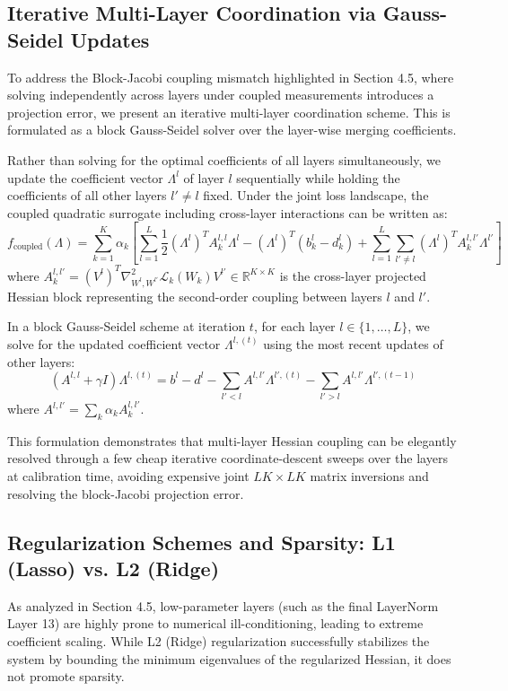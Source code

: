 \subsection{Iterative Multi-Layer Coordination via Gauss-Seidel Updates}
To address the Block-Jacobi coupling mismatch highlighted in Section 4.5, where solving independently across layers under coupled measurements introduces a projection error, we present an iterative multi-layer coordination scheme. This is formulated as a block Gauss-Seidel solver over the layer-wise merging coefficients.

Rather than solving for the optimal coefficients of all layers simultaneously, we update the coefficient vector $\Lambda^l$ of layer $l$ sequentially while holding the coefficients of all other layers $l' \neq l$ fixed. Under the joint loss landscape, the coupled quadratic surrogate including cross-layer interactions can be written as:
\begin{equation}
    f_{\text{coupled}}(\Lambda) = \sum_{k=1}^K \alpha_k \left[ \sum_{l=1}^L \frac{1}{2} (\Lambda^l)^T A^{l,l}_k \Lambda^l - (\Lambda^l)^T (b^l_k - d^l_k) + \sum_{l=1}^L \sum_{l' \neq l} (\Lambda^l)^T A^{l, l'}_k \Lambda^{l'} \right]
\end{equation}
where $A^{l, l'}_k = (V^l)^T \nabla^2_{W^l, W^{l'}} \mathcal{L}_k(W_k) V^{l'} \in \mathbb{R}^{K \times K}$ is the cross-layer projected Hessian block representing the second-order coupling between layers $l$ and $l'$.

In a block Gauss-Seidel scheme at iteration $t$, for each layer $l \in \{1, \dots, L\}$, we solve for the updated coefficient vector $\Lambda^{l,(t)}$ using the most recent updates of other layers:
\begin{equation}
    \left( A^{l,l} + \gamma I \right) \Lambda^{l,(t)} = b^l - d^l - \sum_{l' < l} A^{l, l'} \Lambda^{l',(t)} - \sum_{l' > l} A^{l, l'} \Lambda^{l',(t-1)}
\end{equation}
where $A^{l, l'} = \sum_k \alpha_k A^{l, l'}_k$.

This formulation demonstrates that multi-layer Hessian coupling can be elegantly resolved through a few cheap iterative coordinate-descent sweeps over the layers at calibration time, avoiding expensive joint $LK \times LK$ matrix inversions and resolving the block-Jacobi projection error.

\subsection{Regularization Schemes and Sparsity: L1 (Lasso) vs. L2 (Ridge)}
As analyzed in Section 4.5, low-parameter layers (such as the final LayerNorm Layer 13) are highly prone to numerical ill-conditioning, leading to extreme coefficient scaling. While L2 (Ridge) regularization successfully stabilizes the system by bounding the minimum eigenvalues of the regularized Hessian, it does not promote sparsity.

